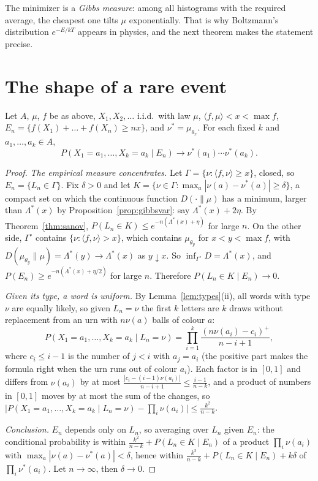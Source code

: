 The minimizer is a \emph{Gibbs measure}: among all histograms with the required average, the cheapest one tilts $\mu$ exponentially. That is why Boltzmann's distribution
$e^{-E/kT}$ appears in physics, and the next theorem makes the statement precise.

\section{The shape of a rare event}

\begin{theorem}\label{thm:gibbscond}
Let $A$, $\mu$, $f$ be as above, $X_1,X_2,\dots$ i.i.d.\ with law $\mu$, $\langle f,\mu\rangle<x<\max f$, $E_n=\{f(X_1)+\dots+f(X_n)\ge nx\}$, and $\nu^*=\mu_{\theta_x}$. For each fixed $k$
and $a_1,\dots,a_k\in A$,
\[
P(X_1=a_1,\dots,X_k=a_k\mid E_n)\longrightarrow\nu^*(a_1)\cdots\nu^*(a_k).
\]
\end{theorem}
\begin{proof}
\emph{The empirical measure concentrates.} Let $\Gamma=\{\nu:\langle f,\nu\rangle\ge x\}$, closed, so $E_n=\{L_n\in\Gamma\}$. Fix $\delta>0$ and let $K=\{\nu\in\Gamma:\max_a|\nu(a)-\nu^*(a)|\ge\delta\}$, a
compact set on which the continuous function $D(\cdot\|\mu)$ has a minimum, larger than $\Lambda^*(x)$ by Proposition~\ref{prop:gibbsvar}: say $\Lambda^*(x)+2\eta$. By Theorem~\ref{thm:sanov},
$P(L_n\in K)\le e^{-n(\Lambda^*(x)+\eta)}$ for large $n$. On the other side, $\Gamma^\circ$ contains $\{\nu:\langle f,\nu\rangle>x\}$, which contains $\mu_{\theta_y}$ for $x<y<\max f$, with
$D(\mu_{\theta_y}\|\mu)=\Lambda^*(y)\to\Lambda^*(x)$ as $y\downarrow x$. So $\inf_{\Gamma^\circ}D=\Lambda^*(x)$, and $P(E_n)\ge e^{-n(\Lambda^*(x)+\eta/2)}$ for large $n$. Therefore
$P(L_n\in K\mid E_n)\to0$.

\emph{Given its type, a word is uniform.} By Lemma~\ref{lem:types}(ii), all words with type $\nu$ are equally likely, so given $L_n=\nu$ the first $k$ letters are $k$ draws without
replacement from an urn with $n\nu(a)$ balls of colour $a$:
\[
P(X_1=a_1,\dots,X_k=a_k\mid L_n=\nu)=\prod_{i=1}^k\frac{(n\nu(a_i)-c_i)^+}{n-i+1},
\]
where $c_i\le i-1$ is the number of $j<i$ with $a_j=a_i$ (the positive part makes the formula right when the urn runs out of colour $a_i$). Each factor is in $[0,1]$
and differs from $\nu(a_i)$ by at most $\frac{|c_i-(i-1)\nu(a_i)|}{n-i+1}\le\frac{i-1}{n-k}$, and a product of numbers in $[0,1]$ moves by at most the sum of the changes, so
$\bigl|P(X_1=a_1,\dots,X_k=a_k\mid L_n=\nu)-\prod_i\nu(a_i)\bigr|\le\frac{k^2}{n-k}$.

\emph{Conclusion.} $E_n$ depends only on $L_n$, so averaging over $L_n$ given $E_n$: the conditional probability is within $\frac{k^2}{n-k}+P(L_n\in K\mid E_n)$ of a product
$\prod_i\nu(a_i)$ with $\max_a|\nu(a)-\nu^*(a)|<\delta$, hence within $\frac{k^2}{n-k}+P(L_n\in K\mid E_n)+k\delta$ of $\prod_i\nu^*(a_i)$. Let $n\to\infty$, then $\delta\to0$.
\end{proof}

